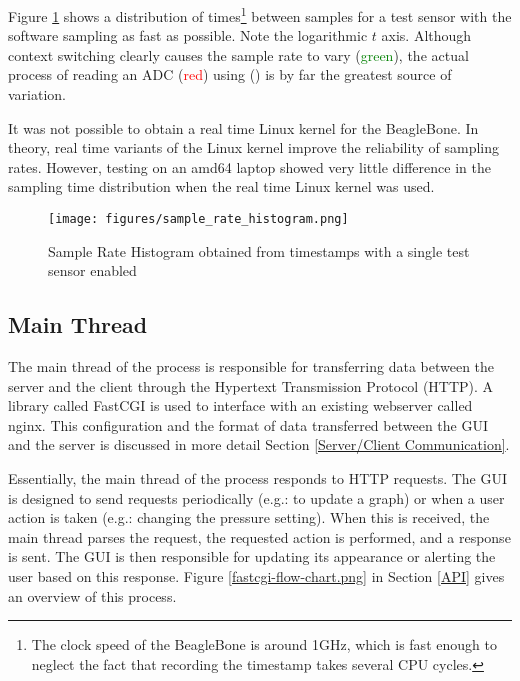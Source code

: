 Figure \ref{sample_rate_histogram.png} shows a distribution of times\footnote{The clock speed of the BeagleBone is around 1GHz\cite{bbb_specs}, which is fast enough to neglect the fact that recording the timestamp takes several CPU cycles.} between samples for a test sensor with the software sampling as fast as possible. Note the logarithmic $t$ axis. Although context switching clearly causes the sample rate to vary (\textcolor{green}{green}), the actual process of reading an ADC (\textcolor{red}{red}) using  () is by far the greatest source of variation.

It was not possible to obtain a real time Linux kernel for the BeagleBone. In theory, real time variants of the Linux kernel improve the reliability of sampling rates. However, testing on an amd64 laptop showed very little difference in the sampling time distribution when the real time Linux kernel was used.


\begin{figure}[H]
	\centering
	\texttt{[image: figures/sample\_rate\_histogram.png]}
	\caption{Sample Rate Histogram obtained from timestamps with a single test sensor enabled}
	\label{sample_rate_histogram.png}
\end{figure}


\subsection{Main Thread}\label{Main Thread}

The main thread of the process is responsible for transferring data between the server and the client through the Hypertext Transmission Protocol (HTTP). A library called FastCGI is used to interface with an existing webserver called nginx\cite{nginx}. This configuration and the format of data transferred between the GUI and the server is discussed in more detail Section \ref{Server/Client Communication}.

Essentially, the main thread of the process responds to HTTP requests. The GUI is designed to send requests periodically (e.g.: to update a graph) or when a user action is taken (e.g.: changing the pressure setting). When this is received, the main thread parses the request, the requested action is performed, and a response is sent. The GUI is then responsible for updating its appearance or alerting the user based on this response. Figure \ref{fastcgi-flow-chart.png} in Section \ref{API} gives an overview of this process.


